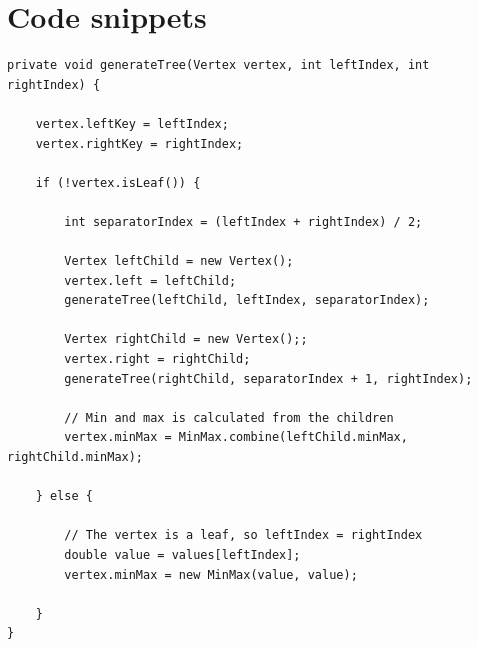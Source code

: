 
\clearpage
\appendix

\section{Code snippets} \label{app:code-snippets}

\begin{lstlisting}[caption=Code for generating range tree recursively, label=listing:generate-tree]
private void generateTree(Vertex vertex, int leftIndex, int rightIndex) {

    vertex.leftKey = leftIndex;
    vertex.rightKey = rightIndex;

    if (!vertex.isLeaf()) {

        int separatorIndex = (leftIndex + rightIndex) / 2;

        Vertex leftChild = new Vertex();
        vertex.left = leftChild;
        generateTree(leftChild, leftIndex, separatorIndex);

        Vertex rightChild = new Vertex();;
        vertex.right = rightChild;
        generateTree(rightChild, separatorIndex + 1, rightIndex);

        // Min and max is calculated from the children
        vertex.minMax = MinMax.combine(leftChild.minMax, rightChild.minMax);

    } else {

        // The vertex is a leaf, so leftIndex = rightIndex
        double value = values[leftIndex];
        vertex.minMax = new MinMax(value, value);

    }
}
\end{lstlisting}


